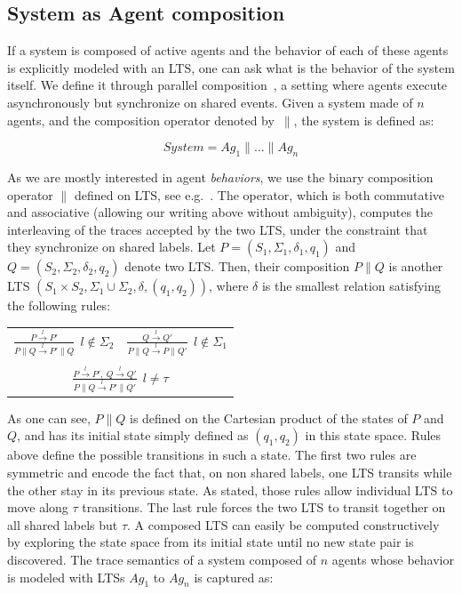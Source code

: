 \subsection{System as Agent composition}

If a system is composed of active agents and the behavior of each of these agents is explicitly modeled with an LTS, one can ask what is the behavior of the system itself. We define it through parallel composition~\cite{Hoare:1985}, a setting where agents execute asynchronously but synchronize on shared events. Given a system made of $n$ agents, and the composition operator denoted by~$\parallel$, the system is defined as:

\begin{equation}
System = Ag_1 \parallel \ldots \parallel Ag_n
\end{equation}

As we are mostly interested in agent \emph{behaviors}, we use the binary composition operator $\parallel$ defined on LTS, see e.g.~\cite{Giannakopoulou:1999, Magee:1999}. The operator, which is both commutative and associative (allowing our writing above without ambiguity), computes the interleaving of the traces accepted by the two LTS, under the constraint that they synchronize on shared labels. Let $P = (S_1,\Sigma_1,\delta_1,q_{1})$ and $Q = (S_2,\Sigma_2,\delta_2,q_{2})$ denote two LTS. Then, their composition $P \parallel Q$ is another LTS $(S_1 \times S_2,\Sigma_1\cup\Sigma_2,\delta,(q_1,q_2))$, where $\delta$ is the smallest relation satisfying the following rules:

\begin{center}
\begin{tabular}{cc}
$\frac{\displaystyle P \stackrel{l}{\longrightarrow} P'}{\displaystyle P \parallel Q \stackrel{l}{\longrightarrow} P' \parallel Q}~~l \notin \Sigma_2$ &
$\frac{\displaystyle Q \stackrel{l}{\longrightarrow} Q'}{\displaystyle P \parallel Q \stackrel{l}{\longrightarrow} P \parallel Q'}~~l \notin \Sigma_1$ \\
 & \\
\multicolumn{2}{c}{$\frac{\displaystyle P \stackrel{l}{\longrightarrow} P',~Q \stackrel{l}{\longrightarrow} Q'}{\displaystyle P \parallel Q \stackrel{l}{\longrightarrow} P' \parallel Q'}~~l \neq \tau$} \\
\end{tabular}
\end{center}

As one can see, $P \parallel Q$ is defined on the Cartesian product of the states of $P$ and $Q$, and has its initial state simply defined as $(q_1,q_2)$ in this state space. Rules above define the possible transitions in such a state. The first two rules are symmetric and encode the fact that, on non shared labels, one LTS transits while the other stay in its previous state. As stated, those rules allow individual LTS to move along $\tau$ transitions. The last rule forces the two LTS to transit together on all shared labels but $\tau$. A composed LTS can easily be computed constructively by exploring the state space from its initial state until no new state pair is discovered. The trace semantics of a system composed of $n$ agents whose behavior is modeled with LTSs $Ag_1$ to $Ag_n$ is captured as:

